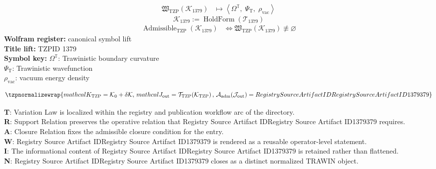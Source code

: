 \noindent
\begin{minipage}[t]{0.48\linewidth}
\begingroup
\small
\[
\begin{aligned}
\mathfrak{W}_{\mathrm{TZP}}\!\left(\mathcal{K}_{1379}\right)
&\longmapsto
\left\langle \Omega^{\mathbb{T}},\; \Psi_{\mathrm{T}},\; \rho_{\mathrm{vac}} \right\rangle
\end{aligned}
\]
\[
\mathcal{K}_{1379}
:=
\operatorname{HoldForm}\!\left(\mathcal{T}_{1379}\right)
\]
\[
\begin{aligned}
\operatorname{Admissible}_{\mathrm{TZP}}\!\left(\mathcal{K}_{1379}\right)
&\Longleftrightarrow
\mathfrak{W}_{\mathrm{TZP}}\!\left(\mathcal{K}_{1379}\right)\not\equiv\varnothing
\end{aligned}
\]
\textbf{Wolfram register:} canonical symbol lift\\
\textbf{Title lift:} TZPID 1379\\
\textbf{Symbol key:} \(\Omega^{\mathbb{T}}\): Trawinistic boundary curvature\\ \(\Psi_{\mathrm{T}}\): Trawinistic wavefunction\\ \(\rho_{\mathrm{vac}}\): vacuum energy density
\par
\endgroup
\end{minipage}\hfill
\begin{minipage}[t]{0.48\linewidth}
\[
\tzpnormalizewrap{mathcal{K}_{\mathrm{TZP}} = \mathcal{K}_0 + \delta \mathcal{K},\,mathcal{J}_{\mathrm{out}} = \mathcal{T}_{\mathrm{TZP}}\!\left(\mathcal{K}_{\mathrm{TZP}}\right),\,\mathcal{A}_{\mathrm{adm}}\!\left(\mathcal{J}_{\mathrm{out}}\right)=Registry Source Artifact IDRegistry Source Artifact ID1379379}
\]

\small
\textbf{T}: Variation Law is localized within the registry and publication workflow arc of the directory.\\
\textbf{R}: Support Relation preserves the operative relation that Registry Source Artifact IDRegistry Source Artifact ID1379379 requires.\\
\textbf{A}: Closure Relation fixes the admissible closure condition for the entry.\\
\textbf{W}: Registry Source Artifact IDRegistry Source Artifact ID1379379 is rendered as a reusable operator-level statement.\\
\textbf{I}: The informational content of Registry Source Artifact IDRegistry Source Artifact ID1379379 is retained rather than flattened.\\
\textbf{N}: Registry Source Artifact IDRegistry Source Artifact ID1379379 closes as a distinct normalized TRAWIN object.
\normalsize
\end{minipage}

